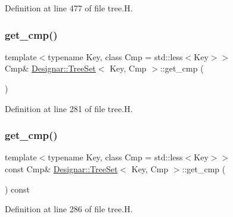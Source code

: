 Definition at line 477 of file tree.\+H.

\mbox{\label{class_designar_1_1_tree_set_aec12ad907a431f411eb06b0643ba9d53}} 
\subsubsection{\texorpdfstring{get\+\_\+cmp()}{get\_cmp()}\hspace{0.1cm}{\footnotesize\ttfamily [1/2]}}
{\footnotesize\ttfamily template$<$typename Key, class Cmp = std\+::less$<$\+Key$>$$>$ \\
Cmp\& \hyperlink{class_designar_1_1_tree_set}{Designar\+::\+Tree\+Set}$<$ Key, Cmp $>$\+::get\+\_\+cmp (\begin{DoxyParamCaption}{ }\end{DoxyParamCaption})\hspace{0.3cm}{\ttfamily [inline]}}



Definition at line 281 of file tree.\+H.

\mbox{\label{class_designar_1_1_tree_set_ae1a8289ce177e865d9987f896038a289}} 
\subsubsection{\texorpdfstring{get\+\_\+cmp()}{get\_cmp()}\hspace{0.1cm}{\footnotesize\ttfamily [2/2]}}
{\footnotesize\ttfamily template$<$typename Key, class Cmp = std\+::less$<$\+Key$>$$>$ \\
const Cmp\& \hyperlink{class_designar_1_1_tree_set}{Designar\+::\+Tree\+Set}$<$ Key, Cmp $>$\+::get\+\_\+cmp (\begin{DoxyParamCaption}{ }\end{DoxyParamCaption}) const\hspace{0.3cm}{\ttfamily [inline]}}



Definition at line 286 of file tree.\+H.

\mbox{\label{class_designar_1_1_tree_set_a4533e89f7cea7d9a6494d443863a3223}} 
